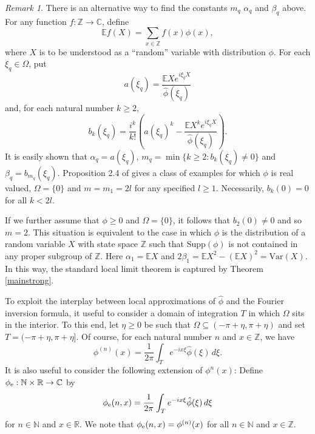 \documentclass{article}
\theoremstyle{theorem}
\theoremstyle{remark}
\newtheorem{remark}{Remark}
\begin{document}
\begin{remark}\label{expectationremark}
There is an alternative way to find the constants $m_q$ $\alpha_q$ and $\beta_q$ above. For any function $f:\mathbb{Z}\rightarrow \mathbb{C}$, define
\begin{equation*}
\mathbb{E}f(X)=\sum_{x\in\mathbb{Z}}f(x)\phi(x),
\end{equation*}
where $X$ is to be understood as a ``random'' variable with distribution $\phi$. For each $\xi_q\in\Omega$, put
\begin{equation*}
a(\xi_q)=\frac{\mathbb{E}Xe^{i\xi_qX}}{\hat\phi(\xi_q)}
\end{equation*}
and, for each natural number $k\geq 2$,
\begin{equation*}
b_k(\xi_q)=\frac{i^k}{k!}\left(a(\xi_q)^k-\frac{\mathbb{E} X^ke^{i\xi_qX}}{\hat\phi(\xi_q)}\right).
\end{equation*}
It is easily shown that $\alpha_q=a(\xi_q)$, $m_q=\min\{k\geq 2:b_k(\xi_q)\neq 0\}$  and $\beta_q=b_{m_q}(\xi_q)$. Proposition 2.4 of \cite{DSC1} gives a class of examples for which $\phi$ is real valued, $\Omega=\{0\}$ and $m=m_1=2l$ for any specified $l\geq 1$. Necessarily, $b_k(0)=0$ for all $k<2l$. 

If we further assume that $\phi\geq 0$ and $\Omega=\{0\}$, it follows that $b_2(0)\neq 0$ and so $m=2$. This situation is equivalent to the case in which $\phi$ is the distribution of a random variable $X$ with state space $\mathbb{Z}$ such that $\mbox{Supp}(\phi)$ is not contained in any proper subgroup of $\mathbb{Z}$. Here $\alpha_1=\mathbb{E} X$ and $2\beta_1=\mathbb{E}X^2-(\mathbb{E}X)^2=\mbox{Var}(X)$.  In this way, the standard local limit theorem is captured by Theorem \ref{mainstrong}. \\ 
\end{remark}

\noindent To exploit the interplay between local approximations of $\hat\phi$ and the Fourier inversion formula, it useful to consider a domain of integration $T$ in which $\Omega$ sits in the interior. To this end, let $\eta\geq 0$ be such that $\Omega\subseteq (-\pi+\eta,\pi+\eta)$ and set $T=(-\pi+\eta,\pi+\eta]$. Of course, for each natural number $n$ and $x\in\mathbb{Z}$, we have
\begin{equation}\label{fouriertransformidentity}
\phi^{(n)}(x)=\frac{1}{2\pi}\int_{T}e^{-ix\xi}\hat\phi(\xi)\,d\xi.
\end{equation}
It is also useful to consider the following extension of $\phi^{n}(x)$: Define $\phi_{\mbox{\scriptsize{e}}}:\mathbb{N}\times\mathbb{R}\rightarrow\mathbb{C}$ by
\begin{equation}\label{phiextdef}
\phi_{\mbox{\scriptsize{e}}}(n,x)=\frac{1}{2\pi}\int_{T}e^{-ix\xi}\hat\phi(\xi)\,d\xi
\end{equation}
for $n\in\mathbb{N}$ and $x\in\mathbb{R}$. We note that $\phi_{\mbox{\scriptsize{e}}}(n,x)=\phi^{(n)}(x)$ for all $n\in\mathbb{N}$ and $x\in\mathbb{Z}$.\\
\end{document}
